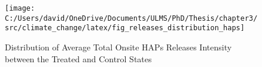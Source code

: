 \begin{figure}[H]
    \centering
    \texttt{[image: C:/Users/david/OneDrive/Documents/ULMS/PhD/Thesis/chapter3/src/climate\_change/latex/fig\_releases\_distribution\_haps]}
    \caption{Distribution of Average Total Onsite HAPs Releases Intensity between the Treated and Control States}
    \label{fig:releases-distribution-haps}
\end{figure}